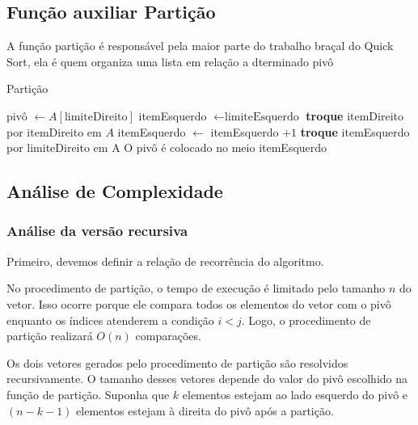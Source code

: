 \subsection{Função auxiliar Partição}

A função partição é responsável pela maior parte do trabalho braçal do Quick Sort, ela é quem organiza uma lista em relação a dterminado pivô

\begin{algorithm}
	\caption{Partição}
	\label{algo:particao}
	\begin{algorithmic}[1]
		\State pivô $\gets A[\text{limiteDireito}]$
		\State itemEsquerdo $\gets \text{limiteEsquerdo}$
		\State \textbf{troque} itemDireito por itemDireito em $A$
		\State itemEsquerdo $\gets$ itemEsquerdo $+ 1$
		\EndIf
		\EndFor
		\State \textbf{troque} itemEsquerdo por limiteDireito em A \Comment O pivô é colocado no meio
		\State \Return itemEsquerdo
		\EndFunction
	\end{algorithmic}
\end{algorithm}
\FloatBarrier

\subsection{Análise de Complexidade}

\subsubsection{Análise da versão recursiva}

Primeiro, devemos definir a relação de recorrência do algoritmo.

No procedimento de partição, o tempo de execução é limitado pelo tamanho \( n \) do vetor. Isso ocorre porque ele compara todos os elementos do vetor com o pivô enquanto os índices atenderem a condição \( i < j \). Logo, o procedimento de partição realizará \( O(n) \) comparações.

Os dois vetores gerados pelo procedimento de partição são resolvidos recursivamente. O tamanho desses vetores depende do valor do pivô escolhido na função de partição. Suponha que \( k \) elementos estejam ao lado esquerdo do pivô e \( (n - k - 1) \) elementos estejam à direita do pivô após a partição.

